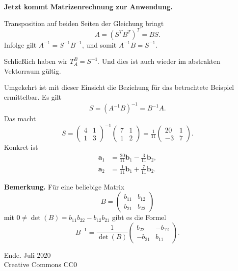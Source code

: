 \documentclass[9pt]{beamer}
\newcommand{\modest}[1]{{\small\color{gray}#1}}
\newcommand{\bv}[1]{\mathbf{#1}}
\newcommand{\strong}[1]{\textsf{\textbf{#1}}}
\begin{document}
\begin{frame}
\strong{Jetzt kommt Matrizenrechnung zur Anwendung.}\pause

\vspace{1em}
Transposition auf beiden Seiten der Gleichung bringt
\[A = (S^T B^T)^T = BS.\]\pause
Infolge gilt $A^{-1} = S^{-1} B^{-1}$, und somit
$A^{-1}B = S^{-1}.$\pause

\vspace{1em}
Schließlich haben wir $T_A^B=S^{-1}$. Und dies ist auch wieder
im abstrakten Vektorraum gültig.
\end{frame}

\begin{frame}
Umgekehrt ist mit dieser Einsicht die Beziehung für das betrachtete
Beispiel ermittelbar. Es gilt
\[S = (A^{-1}B)^{-1} = B^{-1}A.\]\pause
Das macht
\[S = \begin{pmatrix}4 & 1\\ 1 & 3\end{pmatrix}^{-1}
\begin{pmatrix}7 & 1\\ 1 & 2\end{pmatrix}
= \tfrac{1}{11}\begin{pmatrix}20 & 1\\ -3 & 7\end{pmatrix}.\]
Konkret ist
\begin{align*}
\bv a_1 &= \tfrac{20}{11}\bv b_1 - \tfrac{3}{11}\bv b_2,\\
\bv a_2 &= \tfrac{1}{11}\bv b_1 + \tfrac{7}{11}\bv b_2.
\end{align*}
\end{frame}

\begin{frame}
\strong{Bemerkung.} Für eine beliebige Matrix
\[B = \begin{pmatrix}b_{11} & b_{12}\\ b_{21} & b_{22}\end{pmatrix}\]
mit $0\ne \det(B) = b_{11}b_{22}-b_{12}b_{21}$ gibt es die Formel
\[B^{-1} = \frac{1}{\det(B)}\begin{pmatrix}
 b_{22} & -b_{12}\\
-b_{21} &  b_{11}
\end{pmatrix}.\]
\end{frame}

\begin{frame}
Ende.
\vfill\hfill\modest{Juli 2020}\\
\hfill\modest{Creative Commons CC0}
\end{frame}
\end{document}
